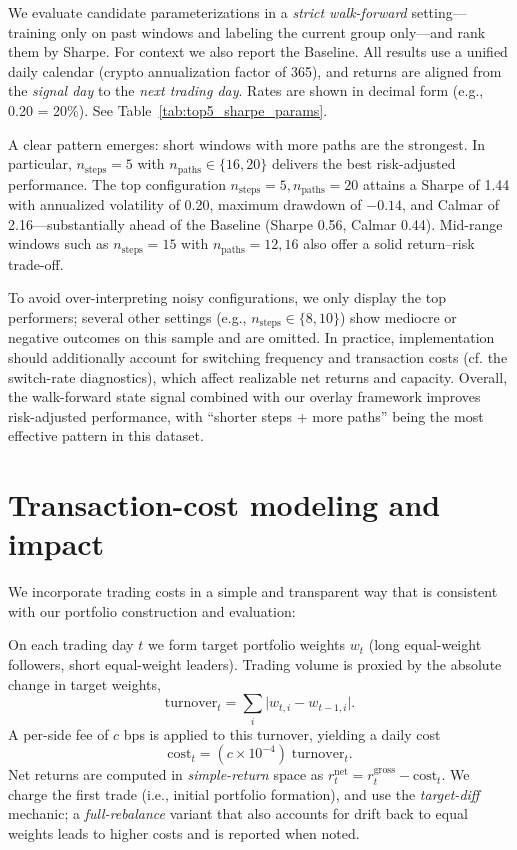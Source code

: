 We evaluate candidate parameterizations in a \emph{strict walk-forward} setting—training only on past windows and labeling the current group only—and rank them by Sharpe. For context we also report the Baseline. All results use a unified daily calendar (crypto annualization factor of 365), and returns are aligned from the \emph{signal day} to the \emph{next trading day}. Rates are shown in decimal form (e.g., 0.20 = 20\%). See Table~\ref{tab:top5_sharpe_params}.

A clear pattern emerges: short windows with more paths are the strongest. In particular, \(n_{\text{steps}}=5\) with \(n_{\text{paths}}\in\{16,20\}\) delivers the best risk-adjusted performance. The top configuration \(n_{\text{steps}}=5, n_{\text{paths}}=20\) attains a Sharpe of 1.44 with annualized volatility of 0.20, maximum drawdown of \(-0.14\), and Calmar of 2.16—substantially ahead of the Baseline (Sharpe 0.56, Calmar 0.44). Mid-range windows such as \(n_{\text{steps}}=15\) with \(n_{\text{paths}}=12,16\) also offer a solid return–risk trade-off.

To avoid over-interpreting noisy configurations, we only display the top performers; several other settings (e.g., \(n_{\text{steps}}\in\{8,10\}\)) show mediocre or negative outcomes on this sample and are omitted. In practice, implementation should additionally account for switching frequency and transaction costs (cf. the switch-rate diagnostics), which affect realizable net returns and capacity. Overall, the walk-forward state signal combined with our overlay framework improves risk-adjusted performance, with “shorter steps + more paths” being the most effective pattern in this dataset.




\section{Transaction-cost modeling and impact}\label{sec:tc}
We incorporate trading costs in a simple and transparent way that is consistent with our portfolio construction and evaluation:

On each trading day \(t\) we form target portfolio weights \(w_t\) (long equal-weight followers, short equal-weight leaders). Trading volume is proxied by the absolute change in target weights,
\[
\text{turnover}_t = \sum_i \lvert w_{t,i} - w_{t-1,i}\rvert.
\]
A per-side fee of \(c\) bps is applied to this turnover, yielding a daily cost
\[
\text{cost}_t = (c\times 10^{-4})\;\text{turnover}_t.
\]
Net returns are computed in \emph{simple-return} space as
\(r^{\text{net}}_t = r^{\text{gross}}_t - \text{cost}_t\).
We charge the first trade (i.e., initial portfolio formation), and use the \emph{target-diff} mechanic; a \emph{full-rebalance} variant that also accounts for drift back to equal weights leads to higher costs and is reported when noted.

